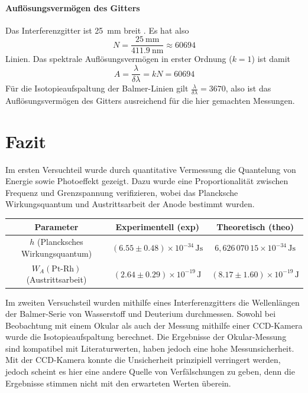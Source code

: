 \documentclass{article}
\begin{document}
\paragraph{Auflösungsvermögen des Gitters}
Das Interferenzgitter ist \SI{25}{\mm} breit \cite{Anleitung}. Es hat also
\[
  N = \frac{\SI{25}{\mm}}{\SI{411.9}{\nm}} \approx 60694 
\]
Linien. Das spektrale Auflösungsvermögen in erster Ordnung ($k=1$) ist damit
\[
  A = \frac{\lambda}{\delta\lambda} = kN = 60694
\]
Für die Isotopieaufspaltung der Balmer-Linien gilt $\frac{\lambda}{\delta\lambda} = 3670$,
also ist das Auflösungsvermögen des Gitters ausreichend für die hier gemachten Messungen.


\clearpage
\section{Fazit}
Im ersten Versuchteil wurde durch quantitative Vermessung die Quantelung von Energie sowie 
Photoeffekt gezeigt. Dazu wurde eine Proportionalität zwischen Frequenz und Grenzspannung
verifizieren, wobei das Plancksche Wirkungsquantum und Austrittsarbeit der Anode 
bestimmt wurden. 
\begin{table}[h!]
  \centering
  \begin{tabular}{|c|c|c|}
  \hline
  \textbf{Parameter} & \textbf{Experimentell (exp)} & \textbf{Theoretisch (theo)} \\
  \hline
  \( h \) (Plancksches Wirkungsquantum) & \( (6.55 \pm 0.48) \times 10^{-34} \, \text{Js} \) & \( 6{,}626\,070\,15 \times 10^{-34} \, \text{Js} \) \\
  \hline
  \( W_A (\text{Pt-Rh}) \) (Austrittsarbeit) & \( (2.64 \pm 0.29) \times 10^{-19} \, \text{J} \) & \( (8.17 \pm 1.60) \times 10^{-19} \, \text{J} \) \\
  \hline
  \end{tabular}
  \label{tab:vergleich}
  \end{table}
  
Im zweiten Versuchsteil wurden mithilfe eines Interferenzgitters die Wellenlängen der Balmer-Serie von Wasserstoff und Deuterium
durchmessen. Sowohl bei Beobachtung mit einem Okular als auch der Messung mithilfe einer CCD-Kamera wurde die Isotopieaufspaltung
berechnet. Die Ergebnisse der Okular-Messung sind kompatibel mit Literaturwerten, haben jedoch eine hohe Messunsicherheit.
Mit der CCD-Kamera konnte die Unsicherheit prinzipiell verringert werden, jedoch scheint es hier eine andere
Quelle von Verfälschungen zu geben, denn die Ergebnisse stimmen nicht mit den erwarteten Werten überein.
\end{document}
